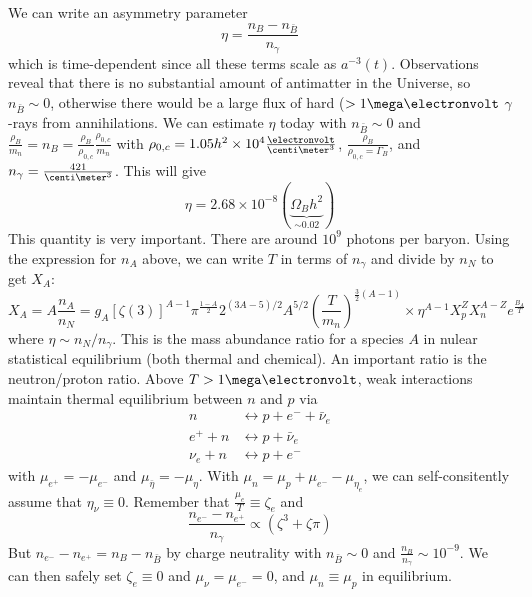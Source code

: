 \documentclass[a4paper,twoside,master.tex]{subfiles}
\begin{document}
We can write an asymmetry parameter
\begin{equation}
    \eta = \frac{n_B - n_{\bar{B}}}{n_{\gamma}}
\end{equation}
which is time-dependent since all these terms scale as $ a^{-3}(t) $. Observations reveal that there is no substantial amount of antimatter in the Universe, so $ n_{\bar{B}} \sim 0 $, otherwise there would be a large flux of hard ($ > 1 \mega\electronvolt $ $ \gamma $-rays from annihilations. We can estimate $ \eta $ today with $ n_{\bar{B}} \sim 0 $ and $ \frac{\rho_B}{m_n} = n_B = \frac{\rho_B}{\rho_{0,c}} \frac{\rho_{0,c}}{m_n} $ with $ \rho_{0,c} = 1.05 h^2 \times 10^{4} \frac{\electronvolt}{\centi\meter^3} $, $ \frac{\rho_B}{\rho_{0,c} = \Gamma_B} $, and $ n_{\gamma} = \frac{421}{\centi\meter^3} $. This will give
\begin{equation}
    \eta = 2.68 \times 10^{-8} (\underbrace{\Omega_B h^2}_{\sim 0.02})
\end{equation}
This quantity is very important. There are around $ 10^9 $ photons per baryon. Using the expression for $ n_A $ above, we can write $ T $ in terms of $ n_{\gamma} $ and divide by $ n_N $ to get $ X_A $:
\begin{equation}
    X_A = A \frac{n_A}{n_N} = g_A [\zeta(3)]^{A-1} \pi^{\frac{1-A}{2}} 2^{(3A-5)/2} A^{5/2} \left( \frac{T}{m_n} \right)^{\frac{3}{2} (A - 1)} \times \eta^{A-1} X_p^Z X_n^{A-Z} e^{\frac{B_A}{T}}
\end{equation}
where $ \eta \sim n_N / n_{\gamma} $. This is the mass abundance ratio for a species $ A $ in nulear statistical equilibrium (both thermal and chemical). An important ratio is the neutron/proton ratio. Above $ T > 1 \mega\electronvolt $, weak interactions maintain thermal equilibrium between $ n $ and $ p $ via
\begin{align}
    n &\leftrightarrow p + e^- + \bar{\nu}_e \\
    e^+ + n &\leftrightarrow p + \bar{\nu}_e \\
    \nu_e + n &\leftrightarrow p + e^-
\end{align}
with $ \mu_{e^+} = - \mu_{e^-} $ and $ \mu_{\bar{\eta}} = - \mu_{\eta} $. With $ \mu_n = \mu_p + \mu_{e^-} - \mu_{\eta_e} $, we can self-consitently assume that $ \eta_{\nu} \equiv 0 $. Remember that $ \frac{\mu_e}{T} \equiv \zeta_e $ and
\begin{equation}
    \frac{n_{e^-} - n_{e^+}}{n_{\gamma}} \propto (\zeta^3 + \zeta \pi)
\end{equation}
But $ n_{e^-} - n_{e^+} = n_B - n_{\bar{B}} $ by charge neutrality with $ n_{\bar{B}} \sim 0 $ and $ \frac{n_B}{n_{\gamma}} \sim 10^{-9} $. We can then safely set $ \zeta_e \equiv 0 $ and $ \mu_{\nu} = \mu_{e^-} = 0 $, and $ \mu_n \equiv \mu_p $ in equilibrium.
\end{document}
